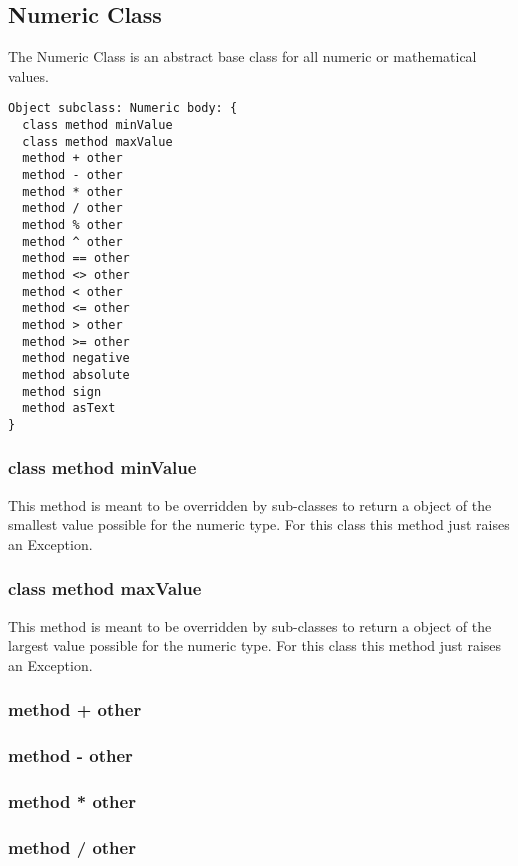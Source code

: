 \subsection{Numeric Class}

The Numeric Class is an abstract base class for all numeric or mathematical values.

\begin{lstlisting}
Object subclass: Numeric body: {
  class method minValue
  class method maxValue
  method + other
  method - other
  method * other
  method / other
  method % other
  method ^ other
  method == other
  method <> other
  method < other
  method <= other
  method > other
  method >= other
  method negative
  method absolute
  method sign
  method asText
}
\end{lstlisting}

\subsubsection{class method minValue}
This method is meant to be overridden by sub-classes to return a object of the smallest value possible for the numeric type. For this class this method just raises an Exception.

\subsubsection{class method maxValue}
This method is meant to be overridden by sub-classes to return a object of the largest value possible for the numeric type. For this class this method just raises an Exception.

\subsubsection{method + other}

\subsubsection{method - other}

\subsubsection{method * other}

\subsubsection{method / other}

